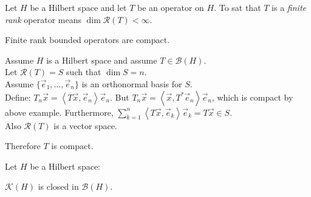 \documentclass[letterpaper,12pt,fleqn]{article}
\newcommand{\ve}{\vec{e}}
\newcommand{\vx}{\vec{x}}
\newcommand{\inner}[1]{\left<#1\right>}
\newcommand{\mb}{\mathcal{B}}
\newcommand{\mk}{\mathcal{K}}
\newcommand{\mr}{\mathcal{R}}
\begin{document}
\begin{definition}
  Let $H$ be a Hilbert space and let $T$ be an operator on $H$. To sat that $T$
  is a \emph{finite rank} operator means $\dim\mr(T)<\infty$.
\end{definition}

\begin{theorem}
  Finite rank bounded operators are compact.
\end{theorem}

\begin{theproof}
  Assume $H$ is a Hilbert space and assume $T\in\mb(H)$. \\
  Let $\mr(T)=S$ such that $\dim S=n$. \\
  Assume $\{\ve_1,\ldots,\ve_n\}$ is an orthonormal basis for $S$. \\
  Define: $T_n\vx=\inner{T\vx,\ve_n}\ve_n$.
  But $T_n\vx=\inner{\vx,T^*\ve_n}\ve_n$, which is compact by above example.
  Furthermore, $\sum_{k=1}^n\inner{T\vx,\ve_k}\ve_k=T\vx\in S$. \\
  Also $\mr(T)$ is a vector space.

  Therefore $T$ is compact.
\end{theproof}

\begin{theorem}
  Let $H$ be a Hilbert space:

  \qquad$\mk(H)$ is closed in $\mb(H)$.
\end{theorem}
\end{document}
